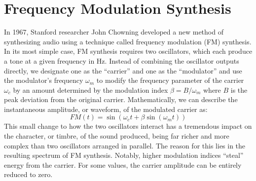 \documentclass[11pt,twoside]{report}
\newcommand{\w}{\omega}
\numberwithin{thm}{section}
\numberwithin{equation}{section}
\begin{document}
\clearpage
\section{Frequency Modulation Synthesis}\label{sec:FM_synthesis}
In 1967, Stanford researcher John Chowning developed a new method of synthesizing audio using a technique called frequency modulation (FM) synthesis. In its most simple case, FM synthesis requires two oscillators, which each produce a tone at a given frequency in Hz. Instead of combining the oscillator outputs directly, we designate one as the ``carrier'' and one as the ``modulator'' and use the modulator's frequency $\w_m$ to modify the frequency parameter of the carrier $\w_c$ by an amount determined by the modulation index $\beta = B/\w_m$ where $B$ is the peak deviation from the original carrier. Mathematically, we can describe the instantaneous amplitude, or waveform, of the modulated carrier as:
\begin{equation}
  FM(t) = \sin(\w_ct + \beta \sin( \w_mt))  
\end{equation}
This small change to how the two oscillators interact has a tremendous impact on the character, or timbre, of the sound produced, being far richer and more complex than two oscillators arranged in parallel. The reason for this lies in the resulting spectrum of FM synthesis. Notably, higher modulation indices ``steal'' energy from the carrier. For some values, the carrier amplitude can be entirely reduced to zero. 
\end{document}
